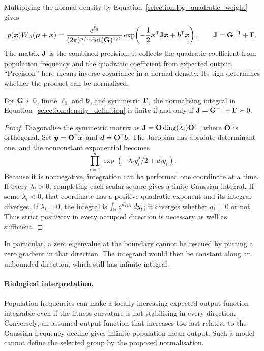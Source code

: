 Multiplying the normal density by
Equation~\eqref{selection:log_quadratic_weight} gives
\begin{equation}
p(\boldsymbol{x})W_A(\boldsymbol{\mu}+\boldsymbol{x})
 =\frac{e^{\ell_0}}{(2\pi)^{n/2}\det(\mathbf{G})^{1/2}}
    \exp\!\left(-\frac12\boldsymbol{x}^{\mathsf T}\mathbf{J}\boldsymbol{x}
                     +\boldsymbol{b}^{\mathsf T}\boldsymbol{x}\right),
\qquad \mathbf{J}=\mathbf{G}^{-1}+\boldsymbol{\Gamma}.
\label{selection:combined_precision}
\end{equation}
The matrix $\mathbf{J}$ is the combined precision: it collects the quadratic
coefficient from population frequency and the quadratic coefficient from
expected output. ``Precision'' here means inverse covariance in a normal
density. Its sign determines whether the product can be normalised.

\begin{proposition}
\label{selection:integrability}
For $\mathbf{G}\succ0$, finite $\ell_0$ and $\boldsymbol{b}$, and symmetric
$\boldsymbol{\Gamma}$, the normalising integral in
Equation~\eqref{selection:density_definition} is finite if and only if
$\mathbf{J}=\mathbf{G}^{-1}+\boldsymbol{\Gamma}\succ0$.
\end{proposition}
\begin{proof}
Diagonalise the symmetric matrix as
$\mathbf{J}=\mathbf{O}\operatorname{diag}(\lambda_i)\mathbf{O}^{\mathsf T}$,
where $\mathbf{O}$ is orthogonal. Set $\boldsymbol{y}=\mathbf{O}^{\mathsf T}\boldsymbol{x}$
and $\boldsymbol{d}=\mathbf{O}^{\mathsf T}\boldsymbol{b}$. The Jacobian has absolute
determinant one, and the nonconstant exponential becomes
\[
\prod_{i=1}^n\exp(-\lambda_i y_i^2/2+d_i y_i).
\]
Because it is nonnegative, integration can be performed one coordinate
at a time. If every $\lambda_i>0$, completing each scalar square gives
a finite Gaussian integral. If some $\lambda_i<0$, that coordinate has
a positive quadratic exponent and its integral diverges. If
$\lambda_i=0$, the integral is $\int_{\mathbb R}e^{d_i y_i}\,dy_i$; it
diverges whether $d_i=0$ or not. Thus strict positivity in every occupied
direction is necessary as well as sufficient.
\end{proof}

In particular, a zero eigenvalue at the boundary cannot be rescued by
putting a zero gradient in that direction. The integrand would then be
constant along an unbounded direction, which still has infinite integral.

\paragraph{Biological interpretation.}
Population frequencies can make a locally increasing expected-output
function integrable even if the fitness curvature is not stabilising in
every direction. Conversely, an assumed output function that increases
too fast relative to the Gaussian frequency decline gives infinite
population mean output. Such a model cannot define the selected group by
the proposed normalisation.

